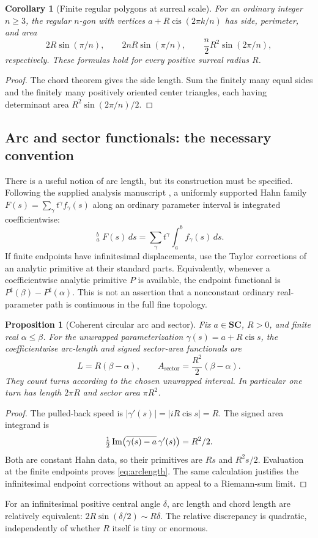 \documentclass[11pt,letterpaper]{article}
\newtheorem{proposition}[theorem]{Proposition}
\newtheorem{corollary}[theorem]{Corollary}
\theoremstyle{definition}
\theoremstyle{remark}
\newcommand{\SC}{\mathbf{SC}}
\newcommand{\sh}{^{\sharp}}
\newcommand{\cis}{\operatorname{cis}}
\newcommand{\HInt}{\mathop{\int^{\!H}}\nolimits}
\numberwithin{equation}{section}
\begin{document}
\begin{corollary}[Finite regular polygons at surreal scale]\label{cor:polygon}
For an ordinary integer $n\ge3$, the regular $n$-gon with vertices $a+R\cis(2\pi k/n)$ has side, perimeter, and area
\[
 2R\sin(\pi/n),\qquad
 2nR\sin(\pi/n),\qquad
 \frac n2R^2\sin(2\pi/n),
\]
respectively. These formulas hold for every positive surreal radius $R$.
\end{corollary}
\begin{proof}
The chord theorem gives the side length. Sum the finitely many equal sides and the finitely many positively oriented center triangles, each having determinant area $R^2\sin(2\pi/n)/2$.
\end{proof}

\subsection{Arc and sector functionals: the necessary convention}
There is a useful notion of arc length, but its construction must be specified. Following the supplied analysis manuscript \cite{InputAnalysis}, a uniformly supported Hahn family $F(s)=\sum_\gamma t^\gamma f_\gamma(s)$ along an ordinary parameter interval is integrated coefficientwise:
\[
 \HInt_a^b F(s)\,ds
 =\sum_\gamma t^\gamma\int_a^b f_\gamma(s)\,ds.
\]
If finite endpoints have infinitesimal displacements, use the Taylor corrections of an analytic primitive at their standard parts. Equivalently, whenever a coefficientwise analytic primitive $P$ is available, the endpoint functional is $P\sh(\beta)-P\sh(\alpha)$. This is not an assertion that a nonconstant ordinary real-parameter path is continuous in the full fine topology.

\begin{proposition}[Coherent circular arc and sector]\label{prop:arc}
Fix $a\in\SC$, $R>0$, and finite real $\alpha\le\beta$. For the unwrapped parameterization $\gamma(s)=a+R\cis s$, the coefficientwise arc-length and signed sector-area functionals are
\begin{equation}\label{eq:arclength}
 L=R(\beta-\alpha),\qquad
 A_{\mathrm{sector}}=\frac{R^2}{2}(\beta-\alpha).
\end{equation}
They count turns according to the chosen unwrapped interval. In particular one turn has length $2\pi R$ and sector area $\pi R^2$.
\end{proposition}
\begin{proof}
The pulled-back speed is $|\gamma'(s)|=|iR\cis s|=R$. The signed area integrand is
\[
 \tfrac12\operatorname{Im}\bigl(\overline{\gamma(s)-a}\,\gamma'(s)\bigr)=R^2/2.
\]
Both are constant Hahn data, so their primitives are $Rs$ and $R^2s/2$. Evaluation at the finite endpoints proves \eqref{eq:arclength}. The same calculation justifies the infinitesimal endpoint corrections without an appeal to a Riemann-sum limit.
\end{proof}
For an infinitesimal positive central angle $\delta$, arc length and chord length are relatively equivalent:
$2R\sin(\delta/2)\sim R\delta$. The relative discrepancy is quadratic, independently of whether $R$ itself is tiny or enormous.
\end{document}
